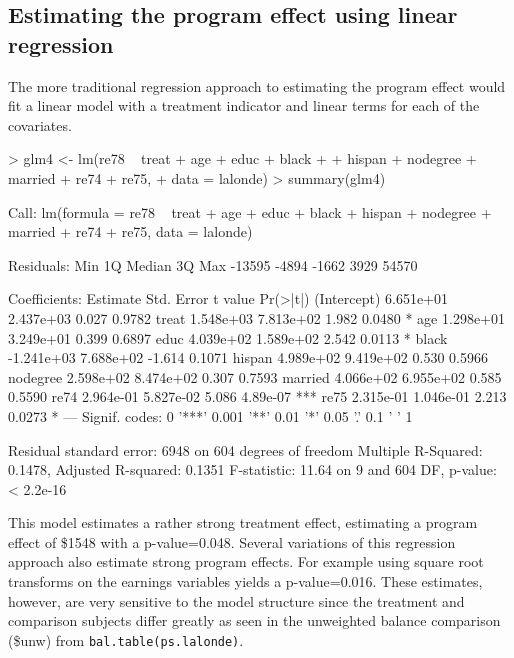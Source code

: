 \documentclass{article}
\begin{document}
\subsection{Estimating the program effect using linear regression}

The more traditional regression approach to estimating the program effect would
fit a linear model with a treatment indicator and linear terms for each of the
covariates.

\begin{Schunk}
\begin{Sinput}
> glm4 <- lm(re78 ~ treat + age + educ + black + 
+     hispan + nodegree + married + re74 + re75, 
+     data = lalonde)
> summary(glm4)
\end{Sinput}
\begin{Soutput}
Call:
lm(formula = re78 ~ treat + age + educ + black + hispan + nodegree + 
    married + re74 + re75, data = lalonde)

Residuals:
   Min     1Q Median     3Q    Max 
-13595  -4894  -1662   3929  54570 

Coefficients:
              Estimate Std. Error t value Pr(>|t|)    
(Intercept)  6.651e+01  2.437e+03   0.027   0.9782    
treat        1.548e+03  7.813e+02   1.982   0.0480 *  
age          1.298e+01  3.249e+01   0.399   0.6897    
educ         4.039e+02  1.589e+02   2.542   0.0113 *  
black       -1.241e+03  7.688e+02  -1.614   0.1071    
hispan       4.989e+02  9.419e+02   0.530   0.5966    
nodegree     2.598e+02  8.474e+02   0.307   0.7593    
married      4.066e+02  6.955e+02   0.585   0.5590    
re74         2.964e-01  5.827e-02   5.086 4.89e-07 ***
re75         2.315e-01  1.046e-01   2.213   0.0273 *  
---
Signif. codes:  0 '***' 0.001 '**' 0.01 '*' 0.05 '.' 0.1 ' ' 1 

Residual standard error: 6948 on 604 degrees of freedom
Multiple R-Squared: 0.1478,	Adjusted R-squared: 0.1351 
F-statistic: 11.64 on 9 and 604 DF,  p-value: < 2.2e-16 
\end{Soutput}
\end{Schunk}


This model estimates a rather strong treatment effect, estimating a program
effect of \$1548 with a
p-value=0.048. Several variations of this
regression approach also estimate strong program effects. For example using
square root transforms on the earnings variables yields a
p-value=0.016. These estimates, however,
are very sensitive to the model structure since the treatment and comparison
subjects differ greatly as seen in the unweighted balance comparison (\$unw) from
\texttt{bal.table(ps.lalonde)}.
\end{document}

